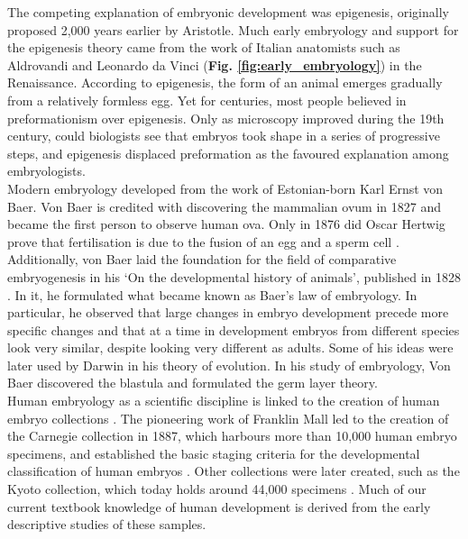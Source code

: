 The competing explanation of embryonic development was epigenesis, originally proposed 2,000 years earlier by Aristotle. 
Much early embryology and support for the epigenesis theory came from the work of Italian anatomists such as Aldrovandi and Leonardo da Vinci (\textbf{Fig. \ref{fig:early_embryology}}) in the Renaissance.
According to epigenesis, the form of an animal emerges gradually from a relatively formless egg. 
Yet for centuries, most people believed in preformationism over epigenesis.
Only as microscopy improved during the 19th century, could biologists see that embryos took shape in a series of progressive steps, and epigenesis displaced preformation as the favoured explanation among embryologists.\\

Modern embryology developed from the work of Estonian-born Karl Ernst von Baer.
Von Baer is credited with discovering the mammalian ovum in 1827 and became the first person to observe human ova.
Only in 1876 did Oscar Hertwig prove that fertilisation is due to the fusion of an egg and a sperm cell \cite{hertwig1875beitraege}.
Additionally, von Baer laid the foundation for the field of comparative embryogenesis in his `On the developmental history of animals', published in 1828 \cite{von1828entwickelungsgeschichte}.
In it, he formulated what became known as Baer's law of embryology.
In particular, he observed that large changes in embryo development precede more specific changes and that at a time in development embryos from different species look very similar, despite looking very different as adults.
Some of his ideas were later used by Darwin in his theory of evolution.
In his study of embryology, Von Baer discovered the blastula and formulated the germ layer theory.\\

Human embryology as a scientific discipline is linked to the creation of human embryo collections \cite{yamada2015human, gasser2014rebirth, shahbazi2020mechanisms}. 
The pioneering work of Franklin Mall led to the creation of the Carnegie collection in 1887, which harbours more than 10,000 human embryo specimens, and established the basic staging criteria for the developmental classification of human embryos \cite{keibel1910manual}. 
Other collections were later created, such as the Kyoto collection, which today holds around 44,000 specimens \cite{nishimura1968normal}. 
Much of our current textbook knowledge of human development is derived from the early descriptive studies of these samples.\\

